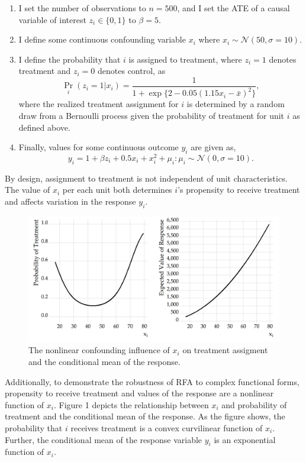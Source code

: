 \documentclass[11pt,]{article}
\providecommand{\tightlist}{%
\setlength{\itemsep}{0pt}\setlength{\parskip}{0pt}}
\begin{document}
\begin{enumerate}
\def\labelenumi{\arabic{enumi}.}
\tightlist
\item
  I set the number of observations to \(n = 500\), and I set the ATE of
  a causal variable of interest \(z_i \in \{0,1\}\) to \(\beta = 5\).
\item
  I define some continuous confounding variable \(x_i\) where
  \(x_i \sim \mathcal{N}(50,\sigma=10)\).
\item
  I define the probability that \(i\) is assigned to treatment, where
  \(z_i = 1\) denotes treatment and \(z_i = 0\) denotes control, as
  \[\Pr_i(z_i = 1|x_i) = \frac{1}{1 + \exp\{2-0.05(1.15x_i - \bar{x})^2 \}},\tag{11}\]
  where the realized treatment assignment for \(i\) is determined by a
  random draw from a Bernoulli process given the probability of
  treatment for unit \(i\) as defined above.
\item
  Finally, values for some continuous outcome \(y_i\) are given as,
  \[y_i = 1 + \beta z_i + 0.5x_i + x_i^2 + \mu_i : \mu_i \sim \mathcal{N}(0,\sigma = 10)\tag{12}.\]
\end{enumerate}

By design, assignment to treatment is not independent of unit
characteristics. The value of \(x_i\) per each unit both determines
\(i\)'s propensity to receive treatment and affects variation in the
response \(y_i\).

\begin{figure}
\centering
\includegraphics{treatment.png}
\caption{The nonlinear confounding influence of \(x_i\) on treatment
assigment and the conditional mean of the response.}
\end{figure}

Additionally, to demonstrate the robustness of RFA to complex functional
forms, propensity to receive treatment and values of the response are a
nonlinear function of \(x_i\). Figure 1 depicts the relationship between
\(x_i\) and probability of treatment and the conditional mean of the
response. As the figure shows, the probability that \(i\) receives
treatment is a convex curvilinear function of \(x_i\). Further, the
conditional mean of the response variable \(y_i\) is an exponential
function of \(x_i\).
\end{document}
